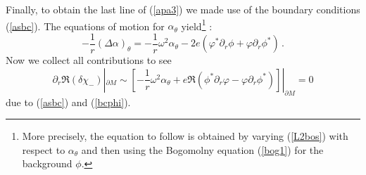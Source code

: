 \documentclass[a4paper,12pt]{article}
\begin{document}
Finally, to obtain the last line of (\ref{apa3}) we made use of
the boundary conditions (\ref{asbc}). The equations of motion for
$\alpha_\theta$ yield\footnote{More precisely, the equation to
follow is obtained by varying (\ref{L2bos}) with respect to
$\alpha_\theta$ and then using the Bogomolny equation (\ref{bog1})
for the background $\phi$.} :
\begin{equation}
-\frac 1r (\Delta \alpha)_\theta = -\frac 1r \omega^2
\alpha_\theta - 2e \left( \varphi^* \partial_r \phi +
\varphi\partial_r \phi^* \right) \,. \label{apa5}
\end{equation}
Now we collect all contributions to see
\begin{equation}
\partial_r \Re (\delta \chi_-) |_{\partial M}\sim
\left[ -\frac 1r \omega^2 \alpha_\theta + e\Re (\phi^*
\partial_r \varphi -\varphi \partial_r \phi^*) \right]|_{\partial M}=0
\label{apa6}
\end{equation}
due to (\ref{asbc}) and (\ref{bcphi}).
\end{document}
